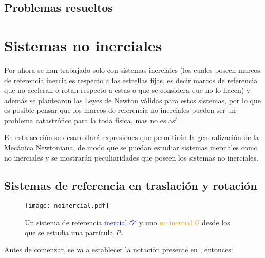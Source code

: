 \documentclass[/home/hernan/Documentos/Apuntes_mecanica_teorica/main.tex]{subfiles}
\begin{document}
	\subsection{Problemas resueltos}


	
	
	\section{Sistemas no inerciales}
	\label{sec: noinerciales}

	Por ahora se han trabajado solo con sistemas inerciales (los cuales poseen marcos de referencia inerciales respecto a las estrellas fijas, es decir marcos de referencia que no aceleran o rotan respecto a estas o que se considera que no lo hacen) y además se plantearon las Leyes de Newton válidas para estos sistemas, por lo que es posible pensar que los marcos de referencia no inerciales pueden ser un problema catastrófico para la toda física, mas no es así. 

	En esta sección se desarrollará expresiones que permitirán la generalización de la Mecánica Newtoniana, de modo que se puedan estudiar sistemas inerciales como no inerciales y se mostrarán peculiaridades que poseen los sistemas no inerciales.

	\subsection{Sistemas de referencia en traslación y rotación}

	\begin{marginfigure}
        \begin{figure}[H]
            \centering
            \texttt{[image: noinercial.pdf]}
            \caption{Un sistema de referencia \textcolor{blue}{inercial ${\mathcal{O}}'$}  y uno \textcolor{orange}{no inercial $\mathcal{O}$} desde los que se estudia una partícula $P$.}
            \label{fig: noinercial}
        \end{figure}
    \end{marginfigure}

	Antes de comenzar, se va a establecer la notación presente en , entonces:
\end{document}
